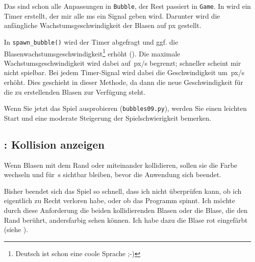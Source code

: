 
Das sind schon alle Anpassungen in \texttt{Bubble}, der Rest passiert in \texttt{Game}. In  wird ein Timer erstellt, der mir alle \unit[1000]{ms} ein Signal geben wird. Darunter wird die anfängliche Wachstumsgeschwindigkeit der Blasen auf \unit[10]{px} gestellt.


In \texttt{spawn\_bubble()} wird der Timer abgefragt und ggf. die Blasenwachstumsgeschwindigkeit\footnote{Deutsch ist schon eine coole Sprache ;-)} erhöht (). Die maximale Wachstumsgeschwindigkeit wird dabei auf~\unit[100]{px/s} begrenzt; schneller scheint mir nicht spielbar. Bei jedem Timer-Signal wird dabei die Geschwindigkeit um~\unit[5]{px/s} erhöht. Dies geschieht in dieser Methode, da dann die neue Geschwindigkeit für die zu erstellenden Blasen zur Verfügung steht.



Wenn Sie jetzt das Spiel ausprobieren (\texttt{bubbles09.py}), werden Sie einen leichten Start und eine moderate Steigerung der Spielschwierigkeit bemerken.

\subsection{: Kollision anzeigen}
	Wenn Blasen mit dem Rand oder miteinander kollidieren, sollen sie die Farbe wechseln und für~\unit[5]{s} sichtbar bleiben, bevor die Anwendung sich beendet.
\er

\begin{figure}%
	\begin{center}%
		\vspace{-1cm}%
	\end{center}%
\end{figure}%
Bisher beendet sich das Spiel so schnell, dass ich nicht überprüfen kann, ob ich eigentlich zu Recht verloren habe, oder ob das Programm spinnt. Ich möchte durch diese Anforderung die beiden kollidierenden Blasen oder die Blase, die den Rand berührt, andersfarbig sehen können. Ich habe dazu die Blase rot eingefärbt (siehe ). 

